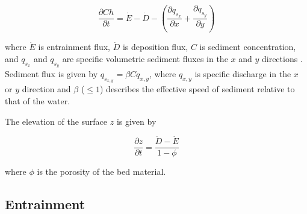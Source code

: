 \documentclass[11pt]{article}
\begin{document}
\begin{equation}
\frac{\partial C h}{\partial t} = \dot{E} - \dot{D} - \left(\frac{\partial q_{s_x}}{\partial x} + \frac{\partial q_{s_y}}{\partial y} \right)
\end{equation}

\noindent where $\dot{E}$ is entrainment flux, $\dot{D}$ is deposition flux, $C$ is sediment concentration, and $q_{s_x}$ and $q_{s_y}$ are specific volumetric sediment fluxes in the $x$ and $y$ directions \citep[e.g.,][]{davy2009fluvial}. Sediment flux is given by $q_{s_{x,y}} = \beta C q_{x,y}$, where $q_{x,y}$ is specific discharge in the $x$ or $y$ direction and $\beta$ ($\le 1$) describes the effective speed of sediment relative to that of the water.

The elevation of the surface $z$ is given by

\begin{equation}
\frac{\partial z}{\partial t} = \frac{\dot{D} - \dot{E}}{1 - \phi}
\end{equation}

\noindent where $\phi$ is the porosity of the bed material.

\subsection{Entrainment}
\end{document}
